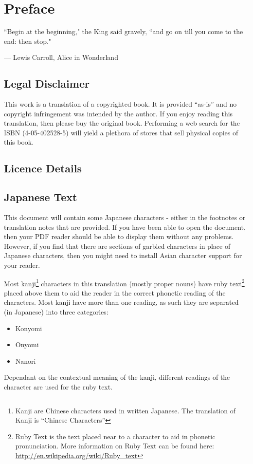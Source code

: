
\chapter*{Preface}

\epigraph{``Begin at the beginning," the King said gravely, ``and go on till you come to the end: then stop."}{--- \textup{Lewis Carroll}, Alice in Wonderland}

\section*{Legal Disclaimer}
This work is a translation of a copyrighted book. It is provided ``as-is'' and no copyright infringement was intended by the author. If you enjoy reading this translation, then please buy the original book. Performing a web search for the ISBN (4-05-402528-5) will yield a plethora of stores that sell physical copies of this book.

\section*{Licence Details}


\section*{Japanese Text}
This document will contain some Japanese characters - either in the footnotes or translation notes that are provided. If you have been able to open the document, then your PDF reader should be able to display them without any problems. However, if you find that there are sections of garbled characters in place of Japanese characters, then you might need to install Asian character support for your reader.

\par Most kanji\footnote{Kanji are Chinese characters used in written Japanese. The translation of Kanji is ``Chinese Characters''} characters in this translation (mostly proper nouns) have ruby text\footnote{Ruby Text is the text placed near to a character to aid in phonetic pronunciation. More information on Ruby Text can be found here: \url{http://en.wikipedia.org/wiki/Ruby_text}} placed above them to aid the reader in the correct phonetic reading of the characters. Most kanji have more than one reading, as such they are separated (in Japanese) into three categories:
\begin{itemize}
\item Konyomi
\item Onyomi
\item Nanori
\end{itemize}

\par Dependant on the contextual meaning of the kanji, different readings of the character are used for the ruby text.
